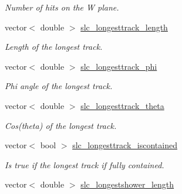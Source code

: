 \begin{DoxyCompactItemize}
\begin{DoxyCompactList}\small\item\em Number of hits on the W plane. \end{DoxyCompactList}\item 
\hypertarget{classUBXSecEvent_ac3a7dd3d816188675925b73049cddc2a}{vector$<$ double $>$ \hyperlink{classUBXSecEvent_ac3a7dd3d816188675925b73049cddc2a}{slc\-\_\-longesttrack\-\_\-length}}\label{classUBXSecEvent_ac3a7dd3d816188675925b73049cddc2a}

\begin{DoxyCompactList}\small\item\em Length of the longest track. \end{DoxyCompactList}\item 
\hypertarget{classUBXSecEvent_a3d3b0be1ba8321dfa3f19fad27ae654c}{vector$<$ double $>$ \hyperlink{classUBXSecEvent_a3d3b0be1ba8321dfa3f19fad27ae654c}{slc\-\_\-longesttrack\-\_\-phi}}\label{classUBXSecEvent_a3d3b0be1ba8321dfa3f19fad27ae654c}

\begin{DoxyCompactList}\small\item\em Phi angle of the longest track. \end{DoxyCompactList}\item 
\hypertarget{classUBXSecEvent_aa3f16db3a887ed53354cae2bb3de19cb}{vector$<$ double $>$ \hyperlink{classUBXSecEvent_aa3f16db3a887ed53354cae2bb3de19cb}{slc\-\_\-longesttrack\-\_\-theta}}\label{classUBXSecEvent_aa3f16db3a887ed53354cae2bb3de19cb}

\begin{DoxyCompactList}\small\item\em Cos(theta) of the longest track. \end{DoxyCompactList}\item 
\hypertarget{classUBXSecEvent_a2e715c70dcf023fddf77ef56c85d01cf}{vector$<$ bool $>$ \hyperlink{classUBXSecEvent_a2e715c70dcf023fddf77ef56c85d01cf}{slc\-\_\-longesttrack\-\_\-iscontained}}\label{classUBXSecEvent_a2e715c70dcf023fddf77ef56c85d01cf}

\begin{DoxyCompactList}\small\item\em Is true if the longest track if fully contained. \end{DoxyCompactList}\item 
\hypertarget{classUBXSecEvent_aa94156d68649226c0251f379072f8fff}{vector$<$ double $>$ \hyperlink{classUBXSecEvent_aa94156d68649226c0251f379072f8fff}{slc\-\_\-longestshower\-\_\-length}}\label{classUBXSecEvent_aa94156d68649226c0251f379072f8fff}


\end{DoxyCompactItemize}

